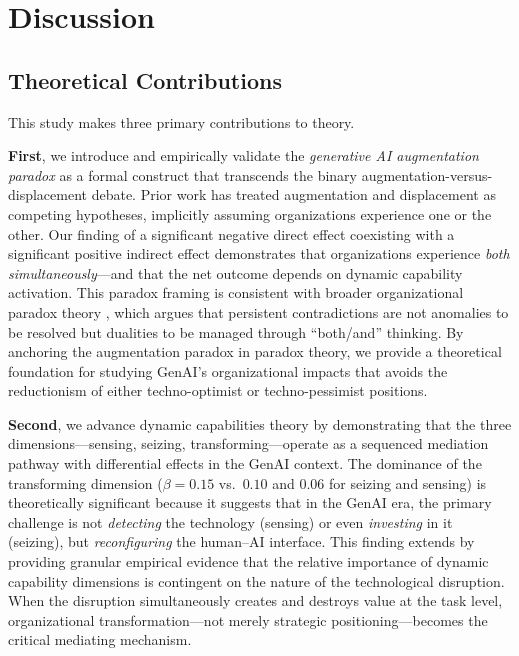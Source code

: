 \documentclass[12pt, a4paper]{article}
\begin{document}
\section{Discussion}

\subsection{Theoretical Contributions}

This study makes three primary contributions to theory.

\textbf{First}, we introduce and empirically validate the \textit{generative AI augmentation paradox} as a formal construct that transcends the binary augmentation-versus-displacement debate. Prior work has treated augmentation \citep{Brynjolfsson2023, Raisch2025} and displacement \citep{Frey2017, Acemoglu2022} as competing hypotheses, implicitly assuming organizations experience one or the other. Our finding of a significant negative direct effect coexisting with a significant positive indirect effect demonstrates that organizations experience \textit{both simultaneously}---and that the net outcome depends on dynamic capability activation. This paradox framing is consistent with broader organizational paradox theory \citep{Smith2011, Schad2016}, which argues that persistent contradictions are not anomalies to be resolved but dualities to be managed through ``both/and'' thinking. By anchoring the augmentation paradox in paradox theory, we provide a theoretical foundation for studying GenAI's organizational impacts that avoids the reductionism of either techno-optimist or techno-pessimist positions.

\textbf{Second}, we advance dynamic capabilities theory by demonstrating that the three dimensions---sensing, seizing, transforming---operate as a sequenced mediation pathway with differential effects in the GenAI context. The dominance of the transforming dimension ($\beta = 0.15$ vs.\ $0.10$ and $0.06$ for seizing and sensing) is theoretically significant because it suggests that in the GenAI era, the primary challenge is not \textit{detecting} the technology (sensing) or even \textit{investing} in it (seizing), but \textit{reconfiguring} the human--AI interface. This finding extends \citet{Teece2018} by providing granular empirical evidence that the relative importance of dynamic capability dimensions is contingent on the nature of the technological disruption. When the disruption simultaneously creates and destroys value at the task level, organizational transformation---not merely strategic positioning---becomes the critical mediating mechanism.
\end{document}
